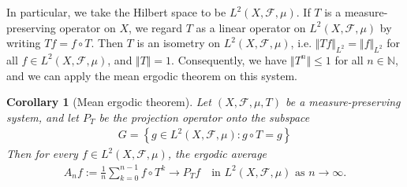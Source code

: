 \documentclass{article}
\numberwithin{equation}{section}
\newcommand{\bbN}{\mathbb{N}}
\newcommand{\scr}{\mathscr}
\theoremstyle{plain}
\newtheorem{corollary}[theorem]{Corollary}
\theoremstyle{definition}
\begin{document}
In particular, we take the Hilbert space to be $L^2(X,\scr{F},\mu)$. If $T$ is a measure-preserving operator on $X$, we regard $T$ as a linear operator on $L^2(X,\scr{F},\mu)$ by writing $Tf=f\circ T$. Then $T$ is an isometry on $L^2(X,\scr{F},\mu)$, i.e. $\Vert Tf\Vert_{L^2}=\Vert f\Vert_{L^2}$ for all $f\in L^2(X,\scr{F},\mu)$, and $\Vert T\Vert=1$. Consequently, we have $\Vert T^n\Vert\leq 1$ for all $n\in\bbN$, and we can apply the mean ergodic theorem on this system.
\begin{corollary}[Mean ergodic theorem]\label{meanergl2}
Let $(X,\scr{F},\mu,T)$ be a measure-preserving system, and let $P_T$ be the projection operator onto the subspace
	\begin{align*}
		G=\left\{g\in L^2(X,\scr{F},\mu):g\circ T=g\right\}
	\end{align*}
	Then for every $f\in L^2(X,\scr{F},\mu)$, the ergodic average
	\begin{align*}
		A_nf:=\frac{1}{n}\sum_{k=0}^{n-1}f\circ T^k\to P_Tf\quad\text{in $L^2(X,\scr{F},\mu)$ as $n\to\infty$}.
	\end{align*}
\end{corollary}
\end{document}
